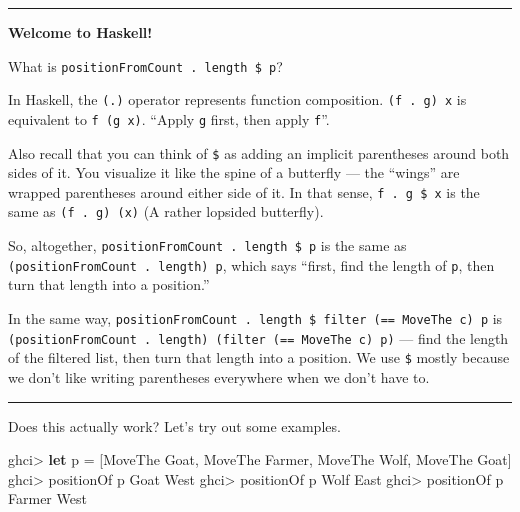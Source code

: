 \documentclass[]{article}
\newenvironment{Shaded}{}{}
\newcommand{\DataTypeTok}[1]{\textcolor[rgb]{0.56,0.13,0.00}{#1}}
\newcommand{\FunctionTok}[1]{\textcolor[rgb]{0.02,0.16,0.49}{#1}}
\newcommand{\KeywordTok}[1]{\textcolor[rgb]{0.00,0.44,0.13}{\textbf{#1}}}
\newcommand{\NormalTok}[1]{#1}
\begin{document}
\begin{center}\rule{0.5\linewidth}{\linethickness}\end{center}

\textbf{Welcome to Haskell!}

What is \texttt{positionFromCount\ .\ length\ \$\ p}?

In Haskell, the \texttt{(.)} operator represents function composition.
\texttt{(f\ .\ g)\ x} is equivalent to \texttt{f\ (g\ x)}. ``Apply \texttt{g}
first, then apply \texttt{f}''.

Also recall that you can think of \texttt{\$} as adding an implicit parentheses
around both sides of it. You visualize it like the spine of a butterfly --- the
``wings'' are wrapped parentheses around either side of it. In that sense,
\texttt{f\ .\ g\ \$\ x} is the same as \texttt{(f\ .\ g)\ (x)} (A rather
lopsided butterfly).

So, altogether, \texttt{positionFromCount\ .\ length\ \$\ p} is the same as
\texttt{(positionFromCount\ .\ length)\ p}, which says ``first, find the length
of \texttt{p}, then turn that length into a position.''

In the same way,
\texttt{positionFromCount\ .\ length\ \$\ filter\ (==\ MoveThe\ c)\ p} is
\texttt{(positionFromCount\ .\ length)\ (filter\ (==\ MoveThe\ c)\ p)} --- find
the length of the filtered list, then turn that length into a position. We use
\texttt{\$} mostly because we don't like writing parentheses everywhere when we
don't have to.

\begin{center}\rule{0.5\linewidth}{\linethickness}\end{center}

Does this actually work? Let's try out some examples.

\begin{Shaded}
\begin{Highlighting}[]
\NormalTok{ghci}\FunctionTok{>} \KeywordTok{let}\NormalTok{ p }\FunctionTok{=}\NormalTok{ [}\DataTypeTok{MoveThe} \DataTypeTok{Goat}\NormalTok{, }\DataTypeTok{MoveThe} \DataTypeTok{Farmer}\NormalTok{, }\DataTypeTok{MoveThe} \DataTypeTok{Wolf}\NormalTok{, }\DataTypeTok{MoveThe} \DataTypeTok{Goat}\NormalTok{]}
\NormalTok{ghci}\FunctionTok{>}\NormalTok{ positionOf p }\DataTypeTok{Goat}
\DataTypeTok{West}
\NormalTok{ghci}\FunctionTok{>}\NormalTok{ positionOf p }\DataTypeTok{Wolf}
\DataTypeTok{East}
\NormalTok{ghci}\FunctionTok{>}\NormalTok{ positionOf p }\DataTypeTok{Farmer}
\DataTypeTok{West}
\end{Highlighting}
\end{Shaded}
\end{document}
